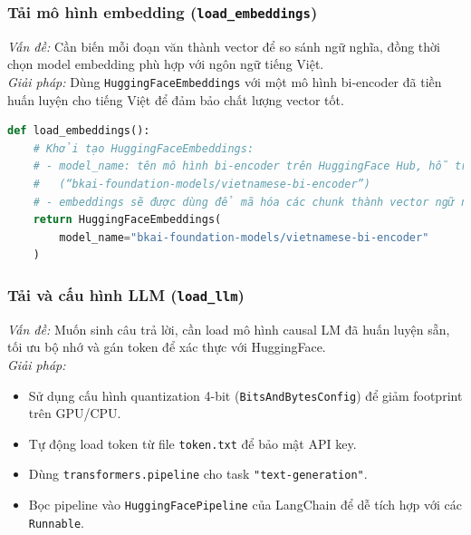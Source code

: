 \documentclass[11pt]{article}
\begin{document}
\subsubsection{Tải mô hình embedding (\texttt{load\_embeddings})}

\textit{Vấn đề:} Cần biến mỗi đoạn văn thành vector để so sánh ngữ nghĩa, đồng thời chọn model embedding phù hợp với ngôn ngữ tiếng Việt.\\

\textit{Giải pháp:} Dùng \texttt{HuggingFaceEmbeddings} với một mô hình bi‑encoder đã tiền huấn luyện cho tiếng Việt để đảm bảo chất lượng vector tốt.\\

\begin{lstlisting}[language=Python, caption=Tải embedding model với comment giải thích]
def load_embeddings():
    # Khởi tạo HuggingFaceEmbeddings:
    # - model_name: tên mô hình bi-encoder trên HuggingFace Hub, hỗ trợ tiếng Việt
    #   (“bkai-foundation-models/vietnamese-bi-encoder”)
    # - embeddings sẽ được dùng để mã hóa các chunk thành vector ngữ nghĩa
    return HuggingFaceEmbeddings(
        model_name="bkai-foundation-models/vietnamese-bi-encoder"
    )
\end{lstlisting}


\subsubsection{Tải và cấu hình LLM (\texttt{load\_llm})}

\textit{Vấn đề:} Muốn sinh câu trả lời, cần load mô hình causal LM đã huấn luyện sẵn, tối ưu bộ nhớ và gán token để xác thực với HuggingFace.\\

\noindent\textit{Giải pháp:}
\begin{itemize}
    \item Sử dụng cấu hình quantization 4-bit (\texttt{BitsAndBytesConfig}) để giảm footprint trên GPU/CPU.
    \item Tự động load token từ file \texttt{token.txt} để bảo mật API key.
    \item Dùng \texttt{transformers.pipeline} cho task \texttt{"text-generation"}.
    \item Bọc pipeline vào \texttt{HuggingFacePipeline} của LangChain để dễ tích hợp với các \texttt{Runnable}.
\end{itemize}
\end{document}
